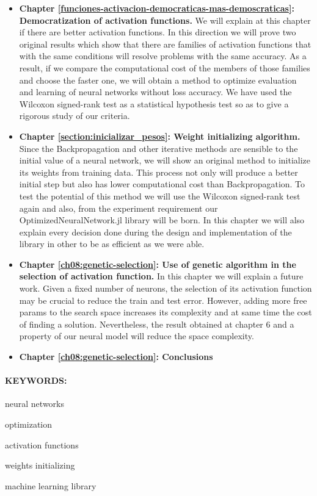 \begin{itemize}
\item \textbf{Chapter \ref{funciones-activacion-democraticas-mas-demoscraticas}: Democratization of activation functions.} We will explain at this chapter if there are better activation functions. In this direction we will prove two original results which show that there are families of activation functions that with the same conditions will resolve problems with the same accuracy. As a result, if we compare the computational cost of the members of those families and choose the faster one, we will obtain a method to optimize evaluation and learning of neural networks without loss accuracy. We have used the Wilcoxon signed-rank test as a statistical hypothesis test so as to give a rigorous study of our criteria. 

\item \textbf{Chapter \ref{section:inicializar_pesos}: Weight initializing algorithm.} Since the Backpropagation and other iterative  methods are sensible to the initial value of a neural network, we will show an original method to initialize its weights from training data. This process not only will produce a better initial step but also has lower computational cost than Backpropagation.  To test the potential of this method we will use the Wilcoxon signed-rank test again and also, from the experiment requirement our OptimizedNeuralNetwork.jl library will be born. In this chapter we will also explain every decision done during the design and implementation of the library in other to be as efficient as we were able.	

\item \textbf{Chapter \ref{ch08:genetic-selection}: Use of genetic algorithm in the selection of activation function.} In this chapter we will explain a future work. Given a fixed number of neurons, the selection of its activation function may be crucial to reduce the train and test error.  However, adding more free params to the search space increases its complexity and at same time the cost of finding a solution.  Nevertheless, the result obtained at chapter 6 and a property of our neural model will reduce the space complexity.
\item \textbf{Chapter \ref{ch08:genetic-selection}: Conclusions}
\end{itemize} 

\paragraph{KEYWORDS:}
\begin{itemize*}[label=,itemsep=1em,itemjoin=\hspace{1em}]
  \item neural networks
  \item optimization
  \item activation functions
  \item weights initializing
  \item machine learning library
\end{itemize*}

\endinput
